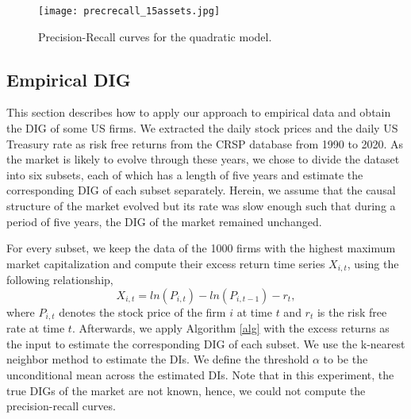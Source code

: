 
\begin{figure}
\centering
\texttt{[image: precrecall\_15assets.jpg]}
\caption{Precision-Recall curves for the quadratic model.}\label{fig:perfnonlin}
\end{figure}

\subsection{Empirical DIG}

This section describes how to apply our approach to empirical data and obtain the DIG of some US firms. 
We extracted the daily stock prices and the daily US Treasury rate as risk free returns from the CRSP database from 1990 to 2020. 
As the market is likely to evolve through these years, 
we chose to divide the dataset into six subsets, each of which has a length of five years and estimate the corresponding DIG of each subset separately. 
Herein, we assume that the causal structure of the market evolved but its rate was slow enough such that during a period of five years, the DIG of the market remained unchanged. 

For every subset, we keep the data of the 1000 firms with the highest maximum market capitalization and compute their excess return time series $X_{i,t}$, using the following relationship,
\begin{equation}
X_{i,t} = ln(P_{i,t}) - ln(P_{i,t-1}) - r_t,  
\end{equation}
where $P_{i,t}$ denotes the stock price of the firm $i$ at time $t$ and $r_{t}$ is the risk free rate at time $t$. 
Afterwards, we apply Algorithm \ref{alg} with the excess returns as the input to estimate the corresponding DIG of each subset. 
We use the k-nearest neighbor method to estimate the DIs.
We define the threshold $\alpha$ to be the unconditional mean across the estimated DIs. Note that in this experiment, the true DIGs of the market are not known, hence, we could not compute the precision-recall curves.

